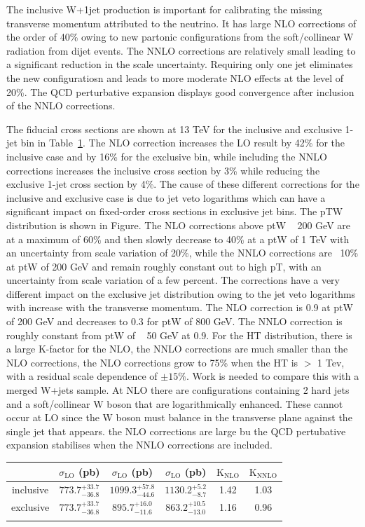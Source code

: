 \documentclass[a4paper,11pt,notoc]{article}
\begin{document}
The inclusive W+1jet production is important for calibrating the missing transverse momentum attributed to the neutrino. It has large NLO corrections of the order of 40\% owing to new partonic configurations from the soft/collinear W radiation from dijet events. The NNLO corrections are relatively small leading to a significant reduction in the scale uncertainty. Requiring only one jet eliminates the new configuratiosn and leads to more moderate NLO effects at the level of 20\%. The QCD perturbative expansion displays good convergence after inclusion of the NNLO corrections.  

The fiducial cross sections are shown at 13 TeV for the inclusive and exclusive 1-jet bin in Table~\ref{tab:Wjet}. The NLO correction increases the LO result by 42\% for the inclusive case and by 16\% for the exclusive bin, while including the NNLO corrections increases the inclusive cross section by 3\% while reducing the exclusive 1-jet cross section by 4\%. The cause of these different corrections for the inclusive and exclusive case is due to jet veto logarithms which can have a significant impact on fixed-order cross sections in exclusive jet bins. The pTW distribution is shown in Figure. The NLO corrections above ptW ~ 200 GeV are at a maximum of 60\% and then slowly decrease to 40\% at a ptW of 1 TeV with an uncertainty from scale variation of 20\%, while the NNLO corrections are ~10\% at ptW of 200 GeV and remain roughly constant out to high pT, with an uncertainty from scale variation of a few percent. The corrections have a very different impact on the exclusive jet distribution owing to the jet veto logarithms with increase with the transverse momentum. The NLO correction is 0.9 at ptW of 200 GeV and decreases to 0.3 for ptW of 800 GeV. The NNLO correction is roughly constant from ptW of ~ 50 GeV at 0.9. For the HT distribution, there is a large K-factor for the NLO, the NNLO corrections are much smaller than the NLO corrections, the NLO corrections grow to 75\% when the HT is $>$ 1 Tev, with a residual scale dependence of $\pm 15\%$. Work is needed to compare this with a merged W+jets sample. At NLO there are configurations containing 2 hard jets and a soft/collinear W boson that are logarithmically enhanced. These cannot occur at LO since the W boson must balance in the transverse plane against the single jet that appears. the NLO corrections are large bu the QCD pertubative expansion stabilises when the NNLO corrections are included. 

\begin{table}[h!]
\centering
\begin{tabular}{|c|ccccc|} \hline
  & $\sigma_{\mathrm {LO}}$ (pb) & $\sigma_{\mathrm {LO}}$ (pb) & $\sigma_{\mathrm {LO}}$ (pb) & $\mathrm {K_{NLO}}$ & $\mathrm {K_{NNLO}}$ \\ \hline 
inclusive & $773.7^{+33.7}_{-36.8}$ & $1099.3^{+57.8}_{-44.6}$ & $1130.2^{+5.2}_{-8.7}$ & 1.42 & 1.03 \\
exclusive & $773.7^{+33.7}_{-36.8}$ & $895.7^{+16.0}_{-11.6}$ & $863.2^{+10.5}_{-13.0}$ & 1.16 & 0.96 \\ \hline
\label{tab:Wjet}
\end{tabular}
\end{table}
\end{document}
